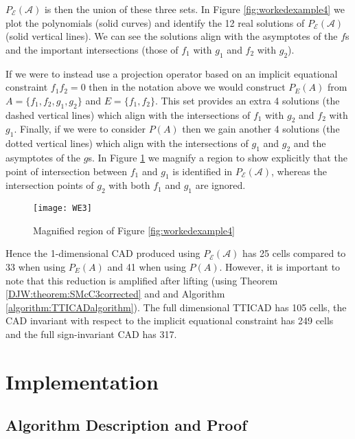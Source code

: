 \documentclass{article}
\begin{document}
$P_{\mathcal{E}}(\mathcal{A})$ is then the union of these three sets.  In Figure \ref{fig:workedexample4} we plot the polynomials (solid curves) and identify the 12 real solutions of $P_{\mathcal{E}}(\mathcal{A})$ (solid vertical lines).  We can see the solutions align with the asymptotes of the $f$s and the important intersections (those of $f_1$ with $g_1$ and $f_2$ with $g_2$).   

If we were to instead use a projection operator based on an implicit equational constraint $f_1f_2=0$ then in the notation above we would construct $P_E(A)$ from $A=\{f_1,f_2,g_1,g_2\}$ and $E=\{f_1,f_2\}$.  This set provides an extra 4 solutions (the dashed vertical lines) which align with the intersections of $f_1$ with $g_2$ and $f_2$ with $g_1$.  
Finally, if we were to consider $P(A)$ then we gain another 4 solutions (the dotted vertical lines) which align with the intersections of $g_1$ and $g_2$ and the asymptotes of the $g$s.  
In Figure \ref{fig:workedexample5} we magnify a region
to show explicitly that the point of intersection between $f_1$ and $g_1$ is identified in $P_{\mathcal{E}}(\mathcal{A})$, whereas the intersection points of $g_2$ with both $f_1$ and $g_1$ are ignored.

\begin{figure}
\caption{Magnified region of Figure \ref{fig:workedexample4}}\label{fig:workedexample5}
\begin{center}
\texttt{[image: WE3]}
\end{center}
\vskip-20pt
\end{figure}

Hence the 1-dimensional CAD produced using $P_{\mathcal{E}}(\mathcal{A})$ has 25 cells compared to 33 when using $P_E(A)$ and 41 when using $P(A)$.  However, it is important to note that this reduction is amplified after lifting (using Theorem \ref{DJW:theorem:SMcC3corrected} and and Algorithm \ref{algorithm:TTICADalgorithm}).  The full dimensional TTICAD has 105 cells, the CAD invariant with respect to the implicit equational constraint has 249 cells  and the full sign-invariant CAD has 317.


\section{Implementation}
\label{sec:Implementation}

\subsection{Algorithm Description and Proof} 
\label{subsec:alg}
\end{document}

